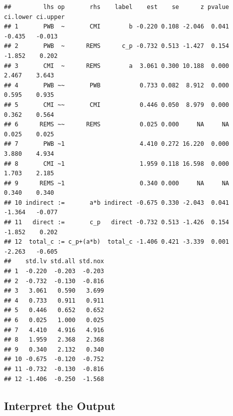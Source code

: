 \documentclass[
  11pt,
]{book}
\begin{document}
\begin{verbatim}
##         lhs op       rhs    label    est    se      z pvalue ci.lower ci.upper
## 1       PWB  ~       CMI        b -0.220 0.108 -2.046  0.041   -0.435   -0.013
## 2       PWB  ~      REMS      c_p -0.732 0.513 -1.427  0.154   -1.852    0.202
## 3       CMI  ~      REMS        a  3.061 0.300 10.188  0.000    2.467    3.643
## 4       PWB ~~       PWB           0.733 0.082  8.912  0.000    0.595    0.935
## 5       CMI ~~       CMI           0.446 0.050  8.979  0.000    0.362    0.564
## 6      REMS ~~      REMS           0.025 0.000     NA     NA    0.025    0.025
## 7       PWB ~1                     4.410 0.272 16.220  0.000    3.880    4.934
## 8       CMI ~1                     1.959 0.118 16.598  0.000    1.703    2.185
## 9      REMS ~1                     0.340 0.000     NA     NA    0.340    0.340
## 10 indirect :=       a*b indirect -0.675 0.330 -2.043  0.041   -1.364   -0.077
## 11   direct :=       c_p   direct -0.732 0.513 -1.426  0.154   -1.852    0.202
## 12  total_c := c_p+(a*b)  total_c -1.406 0.421 -3.339  0.001   -2.263   -0.605
##    std.lv std.all std.nox
## 1  -0.220  -0.203  -0.203
## 2  -0.732  -0.130  -0.816
## 3   3.061   0.590   3.699
## 4   0.733   0.911   0.911
## 5   0.446   0.652   0.652
## 6   0.025   1.000   0.025
## 7   4.410   4.916   4.916
## 8   1.959   2.368   2.368
## 9   0.340   2.132   0.340
## 10 -0.675  -0.120  -0.752
## 11 -0.732  -0.130  -0.816
## 12 -1.406  -0.250  -1.568
\end{verbatim}

\hypertarget{interpret-the-output-1}{%
\subsection{Interpret the Output}\label{interpret-the-output-1}}
\end{document}
